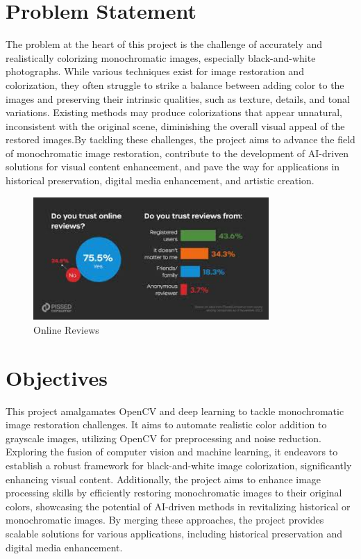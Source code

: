 \section{Problem Statement}
The problem at the heart of this project is the challenge of accurately and realistically colorizing monochromatic images, especially black-and-white photographs. While various techniques exist for image restoration and colorization, they often struggle to strike a balance between adding color to the images and preserving their intrinsic qualities, such as texture, details, and tonal variations. Existing methods may produce colorizations that appear unnatural, inconsistent with the original scene, diminishing the overall visual appeal of the restored images.By tackling these challenges, the project aims to advance the field of monochromatic image restoration, contribute to the development of AI-driven solutions for visual content enhancement, and pave the way for applications in historical preservation, digital media enhancement, and artistic creation.



\begin{figure}[H]
		\centering
		\includegraphics[width=0.8\textwidth]{Pictures/intro2.jpeg}
		\caption{Online Reviews}
\end{figure}
\section{Objectives}
This project amalgamates OpenCV and deep learning to tackle monochromatic image restoration challenges. It aims to automate realistic color addition to grayscale images, utilizing OpenCV for preprocessing and noise reduction. Exploring the fusion of computer vision and machine learning, it endeavors to establish a robust framework for black-and-white image colorization, significantly enhancing visual content. Additionally, the project aims to enhance image processing skills by efficiently restoring monochromatic images to their original colors, showcasing the potential of AI-driven methods in revitalizing historical or monochromatic images. By merging these approaches, the project provides scalable solutions for various applications, including historical preservation and digital media enhancement.



